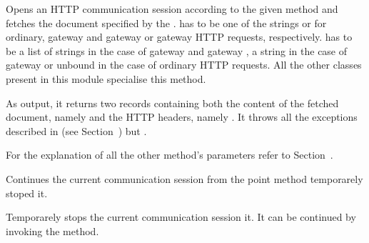 \documentclass{ozdoc}
\begin{document}
\begin{mozartDESCRIPTION}
\mozartITEM Opens an HTTP communication session according to the given method  and fetches the document specified by the .  has to be one of the strings  or  for ordinary, gateway  and gateway  or gateway  HTTP requests, respectively.  has to be a list of  strings in the case of gateway  and gateway , a  string in the case of gateway  or unbound in the case of ordinary HTTP requests. All the other classes present in this module specialise this method.

As output, it returns two records containing both the content of the fetched document, namely  and the HTTP headers, namely . It throws all the exceptions described in (see Section~) but .  

For the explanation of all the other method's parameters refer to Section~. \mozartEMPTY
{}\mozartENTRYHASCODE
\begin{mozartSYNOPSIS}
\begin{mozartCODEDISPLAY}\end{mozartCODEDISPLAY}
\end{mozartSYNOPSIS}
\mozartITEM Continues the current communication session from the point  method temporarely stoped it. \mozartEMPTY
{}\mozartENTRYHASCODE
\begin{mozartSYNOPSIS}
\begin{mozartCODEDISPLAY}\end{mozartCODEDISPLAY}
\end{mozartSYNOPSIS}
\mozartITEM Temporarely stops the current communication session it. It can be continued by invoking the  method. \mozartEMPTY
\end{mozartDESCRIPTION}


\end{document}
